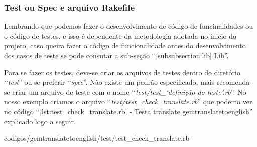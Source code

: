 \subsubsection{Test ou Spec e arquivo Rakefile}
\label{subsubsection:test_ou_spec_e_arquivo_rakefile}

Lembrando que podemos fazer o desenvolvimento de código de funcinalidades ou o código de testes, e isso é
dependente da metodologia adotada no inicio do projeto, caso queira fazer o código de funcionalidade antes
do desenvolvimento dos casos de teste se pode consutar a sub-seção ‘‘\ref{subsubsection:lib} Lib''.

Para se fazer os testes, deve-se criar os arquivos de testes dentro do diretório ‘‘\emph{test}'' ou se 
preferir ‘‘\emph{spec}''. Não existe um padrão especificado, mais recomenda-se criar um arquivo de 
teste com o nome ‘‘\emph{test/test\_‘definição do teste'.rb}''. No nosso exemplo criamos o arquivo 
‘‘\emph{test/test\_check\_translate.rb}'' que podemo ver no código ‘‘\ref{lst:test_check_translate.rb} - 
Testa translate gemtranslatetoenglish'' explicado logo a seguir.


{codigos/gemtranslatetoenglish/test/test_check_translate.rb}

